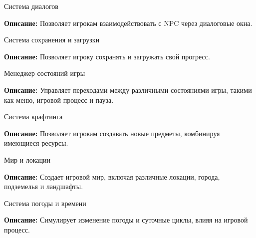 \begin{DoxyEnumerate}
\item Система диалогов
\end{DoxyEnumerate}
\begin{DoxyItemize}
\item {\bfseries{Описание\+:}} Позволяет игрокам взаимодействовать с NPC через диалоговые окна.
\end{DoxyItemize}
\begin{DoxyEnumerate}
\item Система сохранения и загрузки
\end{DoxyEnumerate}
\begin{DoxyItemize}
\item {\bfseries{Описание\+:}} Позволяет игроку сохранять и загружать свой прогресс.
\end{DoxyItemize}
\begin{DoxyEnumerate}
\item Менеджер состояний игры
\end{DoxyEnumerate}
\begin{DoxyItemize}
\item {\bfseries{Описание\+:}} Управляет переходами между различными состояниями игры, такими как меню, игровой процесс и пауза.
\end{DoxyItemize}
\begin{DoxyEnumerate}
\item Система крафтинга
\end{DoxyEnumerate}
\begin{DoxyItemize}
\item {\bfseries{Описание\+:}} Позволяет игрокам создавать новые предметы, комбинируя имеющиеся ресурсы.
\end{DoxyItemize}
\begin{DoxyEnumerate}
\item Мир и локации
\end{DoxyEnumerate}
\begin{DoxyItemize}
\item {\bfseries{Описание\+:}} Создает игровой мир, включая различные локации, города, подземелья и ландшафты.
\end{DoxyItemize}
\begin{DoxyEnumerate}
\item Система погоды и времени
\end{DoxyEnumerate}
\begin{DoxyItemize}
\item {\bfseries{Описание\+:}} Симулирует изменение погоды и суточные циклы, влияя на игровой процесс.
\end{DoxyItemize}
